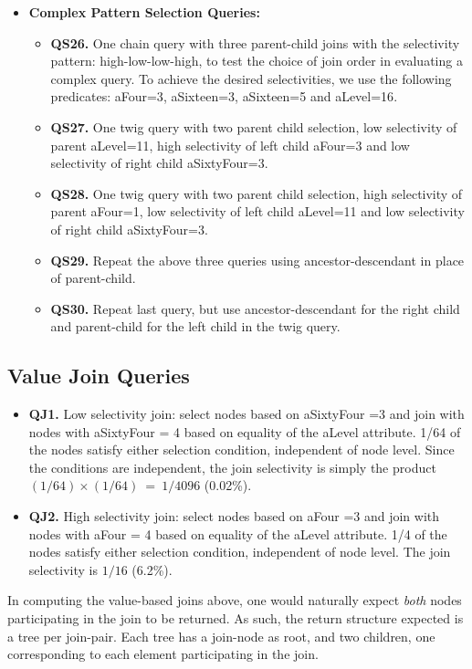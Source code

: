 \begin{itemize}
\item {\bf Complex Pattern Selection Queries:}
\begin {itemize}
\item {\bf QS26.} One chain query with three parent-child joins with the selectivity pattern: high-low-low-high, to test the choice of join order in evaluating a complex query. To achieve the desired selectivities, we use the following predicates:  {\sf aFour=3}, {\sf aSixteen=3}, {\sf aSixteen=5} and {\sf aLevel=16}.
\item {\bf QS27.} One twig query with two parent child selection, low selectivity of parent {\sf aLevel=11}, high selectivity of left child {\sf aFour=3} and low selectivity of right child {\sf aSixtyFour=3}.
\item {\bf QS28.} One twig query with two parent child selection, high selectivity of
parent {\sf aFour=1}, low selectivity of left child {\sf aLevel=11} and low
selectivity of right child {\sf aSixtyFour=3}.
\item
{\bf QS29.} Repeat the above three queries using ancestor-descendant in place of
parent-child.
\item
{\bf QS30.} Repeat last query, but use ancestor-descendant for the right child and
parent-child for the left child in the twig query.
\end {itemize}
\end {itemize}

\subsection{Value Join Queries}
\begin {itemize}
\item {\bf QJ1.} Low selectivity join: select nodes based on {\sf aSixtyFour =3}
and join with nodes with {\sf aSixtyFour = 4} based on equality of the {\sf
aLevel} attribute.  1/64 of the nodes satisfy either selection condition,
independent of node level.  Since the conditions are independent, the join
selectivity is simply the product $(1/64) \times (1/64) ~=~ 1/4096$ (0.02\%).
\item {\bf QJ2.} High selectivity join: select nodes based on {\sf aFour =3} and
join with nodes with {\sf aFour = 4} based on equality of the {\sf aLevel}
attribute.  1/4 of the nodes satisfy either selection condition,
independent of node level.  The join selectivity is $1/16$ (6.2\%).
\end {itemize}
In computing the value-based joins above, one would naturally expect {\em
both} nodes participating in the join to be returned.  As such, the return
structure expected is a tree per join-pair.  Each tree has a join-node as
root, and two children, one corresponding to each element participating in
the join.

